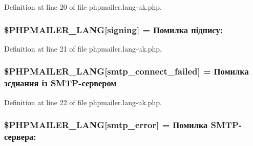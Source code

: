 Definition at line 20 of file phpmailer.\+lang-\/uk.\+php.

\subsubsection[{\texorpdfstring{\$\+P\+H\+P\+M\+A\+I\+L\+E\+R\+\_\+\+L\+A\+NG}{$PHPMAILER_LANG}}]{\setlength{\rightskip}{0pt plus 5cm}\$P\+H\+P\+M\+A\+I\+L\+E\+R\+\_\+\+L\+A\+NG\mbox{[}\textquotesingle{}signing\textquotesingle{}\mbox{]} = \textquotesingle{}Помилка підпису\+: \textquotesingle{}}\hypertarget{phpmailer_8lang-uk_8php_a68e437bdb9b968a5a67320f03d231565}{}\label{phpmailer_8lang-uk_8php_a68e437bdb9b968a5a67320f03d231565}


Definition at line 21 of file phpmailer.\+lang-\/uk.\+php.

\subsubsection[{\texorpdfstring{\$\+P\+H\+P\+M\+A\+I\+L\+E\+R\+\_\+\+L\+A\+NG}{$PHPMAILER_LANG}}]{\setlength{\rightskip}{0pt plus 5cm}\$P\+H\+P\+M\+A\+I\+L\+E\+R\+\_\+\+L\+A\+NG\mbox{[}\textquotesingle{}smtp\+\_\+connect\+\_\+failed\textquotesingle{}\mbox{]} = \textquotesingle{}Помилка зєднання із {\bf S\+M\+TP}-\/сервером\textquotesingle{}}\hypertarget{phpmailer_8lang-uk_8php_a7b321d4ca1e9df702403ed4c61aa0980}{}\label{phpmailer_8lang-uk_8php_a7b321d4ca1e9df702403ed4c61aa0980}


Definition at line 22 of file phpmailer.\+lang-\/uk.\+php.

\subsubsection[{\texorpdfstring{\$\+P\+H\+P\+M\+A\+I\+L\+E\+R\+\_\+\+L\+A\+NG}{$PHPMAILER_LANG}}]{\setlength{\rightskip}{0pt plus 5cm}\$P\+H\+P\+M\+A\+I\+L\+E\+R\+\_\+\+L\+A\+NG\mbox{[}\textquotesingle{}smtp\+\_\+error\textquotesingle{}\mbox{]} = \textquotesingle{}Помилка {\bf S\+M\+TP}-\/сервера\+: \textquotesingle{}}\hypertarget{phpmailer_8lang-uk_8php_a7d9cffba1e669c845f8a4c891ee50064}{}\label{phpmailer_8lang-uk_8php_a7d9cffba1e669c845f8a4c891ee50064}


